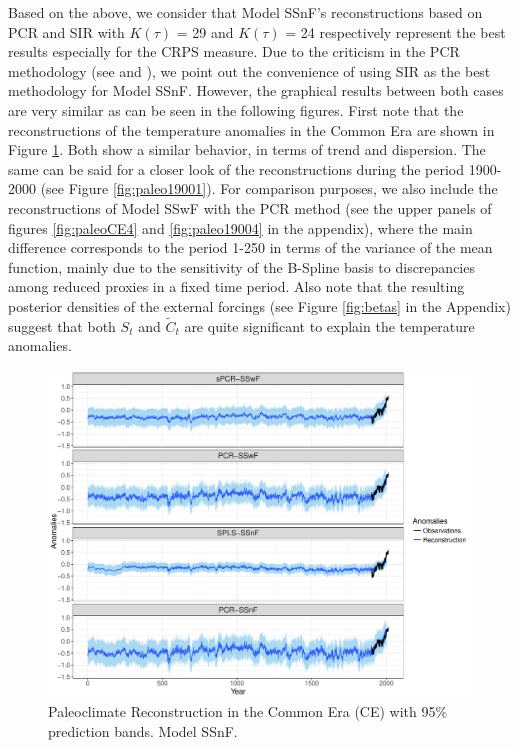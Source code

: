 \documentclass[11pt]{amsart}
\theoremstyle{plain}
\theoremstyle{definition}
\theoremstyle{remark}
\begin{document}
Based on the above, we consider that Model SSnF's reconstructions based on PCR and SIR
with $K(\tau)$ = 29 and $K(\tau)$ = 24 respectively represent the best results
especially for the CRPS measure. Due to the criticism in the PCR methodology
(see \cite{Jolliffe1982} and \cite{Tibshirani1996}), we point out the convenience of using SIR as the best methodology for
Model SSnF. However, the graphical results between both cases are very similar as
can be seen in the following figures. First note that the reconstructions of the
temperature anomalies in the Common Era are shown in
Figure \ref{fig:paleoCE1}. Both
show a similar behavior, in terms of trend and dispersion. The same can be said
for a closer look of the reconstructions during the period 1900-2000 (see
Figure \ref{fig:paleo19001}). For comparison purposes,
we also include the reconstructions of Model SSwF with the PCR method (see the
upper panels of 
figures \ref{fig:paleoCE4} and \ref{fig:paleo19004} in the appendix), where the
main difference corresponds to the period 1-250 in terms of the variance of the
mean function, mainly due to the sensitivity of the B-Spline basis to
discrepancies among reduced proxies in a fixed time period. Also note that the
resulting posterior densities of the external forcings (see Figure
\ref{fig:betas} in the Appendix) suggest that both $S_t$
and $\tilde C_t$ are quite significant to explain the temperature anomalies.    
\begin{figure}
  \centering
  \includegraphics[scale=0.45]{RecCE_Final}
  \caption{Paleoclimate Reconstruction in the Common Era (CE) with 95\%
    prediction bands. Model SSnF.}
  \label{fig:paleoCE1}
\end{figure}
\end{document}
